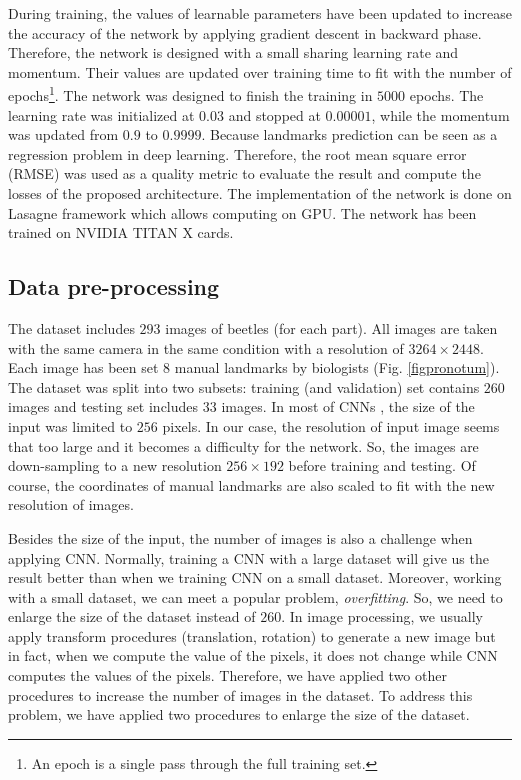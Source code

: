 \documentclass[10pt]{article}
\begin{document}
During training, the values of learnable parameters have been updated to increase the accuracy of the network by applying gradient descent in backward phase. Therefore, the network is designed with a small sharing learning rate and momentum. Their values are updated over training time to fit with the number of epochs\footnote{An epoch is a single pass through the full training set.}. The network was designed to finish the training in $5000$ epochs. The learning rate was initialized at $0.03$ and stopped at $0.00001$, while the momentum was updated from $0.9$ to $0.9999$. 
Because landmarks prediction can be seen as a regression problem in deep learning. Therefore, the root mean square error (RMSE) was used as a quality metric to evaluate the result and compute the losses of the proposed architecture. The implementation of the network is done on Lasagne framework \cite{lasagne} which allows computing on GPU. The network has been trained on NVIDIA TITAN X cards.

\subsection{Data pre-processing}
\label{sec_data}
The dataset includes $293$ images of beetles (for each part). All images are taken with the same camera in the same condition with a resolution of $3264 \times 2448$. Each image has been set $8$ manual landmarks by biologists (Fig. \ref{figpronotum}). The dataset was split into two subsets: training (and validation) set contains $260$ images and testing set includes $33$ images. In most of CNNs \cite{lecun2010convolutional, sun2013deep,  krizhevsky2012imagenet, cintas2016automatic}, the size of the input was limited to $256$ pixels. In our case, the resolution of input image seems that too large and it becomes a difficulty for the network. So, the images are down-sampling to a new resolution $256 \times 192$ before training and testing. Of course, the coordinates of manual landmarks are also scaled to fit with the new resolution of images.

Besides the size of the input, the number of images is also a challenge when applying CNN. Normally, training a CNN with a large dataset will give us the result better than when we training CNN on a small dataset. Moreover, working with a small dataset, we can meet a popular problem, \textit{overfitting}. So, we need to enlarge the size of the dataset instead of $260$. In image processing, we usually apply transform procedures (translation, rotation) to generate a new image but in fact, when we compute the value of the pixels, it does not change while CNN computes the values of the pixels. Therefore, we have applied two other procedures to increase the number of images in the dataset. To address this problem, we have applied two procedures to enlarge the size of the dataset.
\end{document}
